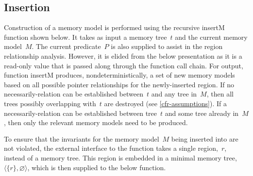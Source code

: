 \subsection{Insertion}
Construction of a memory model is performed
using the recursive \gls{insertM} function shown below.
It takes as input a memory tree~$t$ and the current memory model~$M$.
The current predicate~$P$ is also supplied
to assist in the region relationship analysis.
However, it is elided from the below presentation as it is a read-only value
that is passed along through the function call chain.
For output, function \gls{insertM} produces, nondeterministically,
a set of new memory models based on all possible pointer relationships
for the newly-inserted region.
If no necessarily-relation can be established between~$t$ and any tree in~$M$, then all trees possibly overlapping with~$t$ are destroyed (see \cref{cfr-assumptions}).
If a necessarily-relation can be established between tree~$t$ and some tree already in~$M$, then only the relevant memory models need to be produced.

To ensure that the invariants for the memory model~$M$ being inserted into
are not violated, the external interface to the function takes a single region,~$r$, instead of a memory tree.
This region is embedded in a minimal memory tree,
$\langle \{r\},\varnothing\rangle$,
which is then supplied to the below function.

